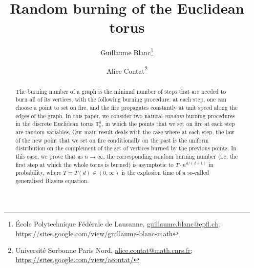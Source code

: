 \documentclass[a4paper,11pt]{article}
\author{Guillaume Blanc\thanks{École Polytechnique Fédérale de Lausanne, \href{mailto:guillaume.blanc@epfl.ch}{guillaume.blanc@epfl.ch}; \url{https://sites.google.com/view/guillaume-blanc-math}} \and Alice Contat\thanks{Université Sorbonne Paris Nord, \href{mailto:alice.contat@math.cnrs.fr}{alice.contat@math.cnrs.fr}; \url{https://sites.google.com/view/acontat/}}}
\title{Random burning of the Euclidean torus}
\date{}
\begin{document}
\theoremstyle{plain}
\newtheorem{thm}{Theorem}
\newtheorem*{thm*}{Theorem}
\newtheorem{prop}{Proposition}
\newtheorem{lem}{Lemma}
\newtheorem{cor}{Corollary}
\newtheorem{claim}{Claim}
\newtheorem{conj}{Conjecture}

\theoremstyle{remark}
\newtheorem{rem}{Remark}

\maketitle

\begin{abstract}
The burning number of a graph is the minimal number of steps that are needed to burn all of its vertices, with the following burning procedure: at each step, one can choose a point to set on fire, and the fire propagates constantly at unit speed along the edges of the graph.
In this paper, we consider two natural \emph{random} burning procedures in the discrete Euclidean torus $\mathbb{T}_n^d$, in which the points that we set on fire at each step are random variables.
Our main result deals with the case where at each step, the law of the new point that we set on fire conditionally on the past is the uniform distribution on the complement of the set of vertices burned by the previous points.
In this case, we prove that as $n\to\infty$, the corresponding random burning number (i.e, the first step at which the whole torus is burned) is asymptotic to $T\cdot n^{d/(d+1)}$ in probability, where $T=T(d)\in(0,\infty)$ is the explosion time of a so-called generalised Blasius equation.
\end{abstract}
\end{document}
